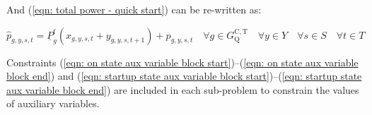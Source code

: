 \documentclass{article}
\newcommand{\sYears}{Y}
\newcommand{\sScenarios}{S}
\newcommand{\sIntervals}{T}
\newcommand{\sGeneratorsCandidateThermalQuickStart}{G^{\mathrm{C,T}}_\mathrm{Q}}
\newcommand{\iGenerator}{g}
\newcommand{\iYear}{y}
\newcommand{\iScenario}{s}
\newcommand{\iInterval}{t}
\newcommand{\cPowerOutputMin}[1][\iGenerator]{\underline{P}_{#1}}
\newcommand{\cPowerOutputMinProportion}{\cPowerOutputMin^{\mathrm{f}}}
\newcommand{\vPower}[1][\iGenerator,\iYear,\iScenario,\iInterval]{p_{#1}}
\newcommand{\vPowerTotal}[1][\iGenerator,\iYear,\iScenario,\iInterval]{\hat{p}_{#1}}
\newcommand{\vInstalledCapacityOnStateAux}[1][\iGenerator,\iYear,\iScenario,\iInterval]{x_{#1}}
\newcommand{\vInstalledCapacityStartupStateAux}[1][\iGenerator,\iYear,\iScenario,\iInterval]{y_{#1}}
\begin{document}
And (\ref{eqn: total power - quick start}) can be re-written as:

\begin{equation}
	\vPowerTotal = \cPowerOutputMinProportion \left(\vInstalledCapacityOnStateAux + \vInstalledCapacityStartupStateAux[\iGenerator,\iYear,\iScenario,\iInterval+1]\right) + \vPower \quad \forall \iGenerator \in \sGeneratorsCandidateThermalQuickStart \quad \forall \iYear \in \sYears \quad \forall \iScenario \in \sScenarios \quad \forall \iInterval \in \sIntervals
\end{equation}

Constraints (\ref{eqn: on state aux variable block start})--(\ref{eqn: on state aux variable block end}) and (\ref{eqn: startup state aux variable block start})--(\ref{eqn: startup state aux variable block end}) are included in each sub-problem to constrain the values of auxiliary variables.
\end{document}
